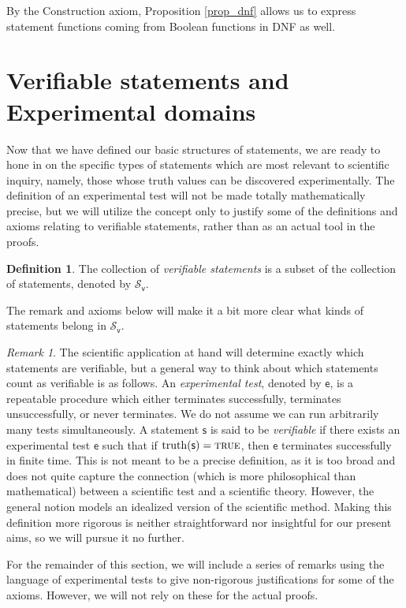 \documentclass[psamsfonts]{amsart}
\theoremstyle{definition}
\newtheorem{defn}[thm]{Definition}
\theoremstyle{remark}
\newtheorem{rem}[thm]{Remark}
\numberwithin{equation}{section}
\DeclareMathOperator{\truth}{truth}
\def\TRUE{\textsc{true}}
\def\vstmtSet{\mathcal{S}_\textsf{v}}
\newcommand{\stmt}[1][s] {\mathsf{#1}}
\newcommand{\expt}[1][e] {\mathsf{#1}}
\begin{document}
By the Construction axiom, Proposition \ref{prop_dnf} allows us to express statement functions coming from Boolean functions in DNF as well. 

\section{Verifiable statements and Experimental domains}
\label{verifiable}
Now that we have defined our basic structures of statements, we are ready to hone in on the specific types of statements which are most relevant to scientific inquiry, namely, those whose truth values can be discovered experimentally. The definition of an experimental test will not be made totally mathematically precise, but we will utilize the concept only to justify some of the definitions and axioms relating to verifiable statements, rather than as an actual tool in the proofs. 

\begin{defn}\label{verifiable_statements}
The collection of \emph{verifiable statements} is a subset of the collection of statements, denoted by $\vstmtSet$. 
\end{defn}

The remark and axioms below will make it a bit more clear what kinds of statements belong in $\vstmtSet$. 

\begin{rem}
The scientific application at hand will determine exactly which statements are verifiable, but a general way to think about which statements count as verifiable is as follows. An \emph{experimental test}, denoted by $\expt$, is a repeatable procedure which either terminates successfully, terminates unsuccessfully, or never terminates. We do not assume we can run arbitrarily many tests simultaneously. A statement $\stmt$ is said to be \emph{verifiable} if there exists an experimental test $\expt$ such that if $\truth(\stmt)=\TRUE$, then $\expt$ terminates successfully in finite time. This is not meant to be a precise definition, as it is too broad and does not quite capture the connection (which is more philosophical than mathematical) between a scientific test and a scientific theory. However, the general notion models an idealized version of the scientific method. Making this definition more rigorous is neither straightforward nor insightful for our present aims, so we will pursue it no further. 

For the remainder of this section, we will include a series of remarks using the language of experimental tests to give non-rigorous justifications for some of the axioms. However, we will not rely on these for the actual proofs. 
\end{rem}
\end{document}
